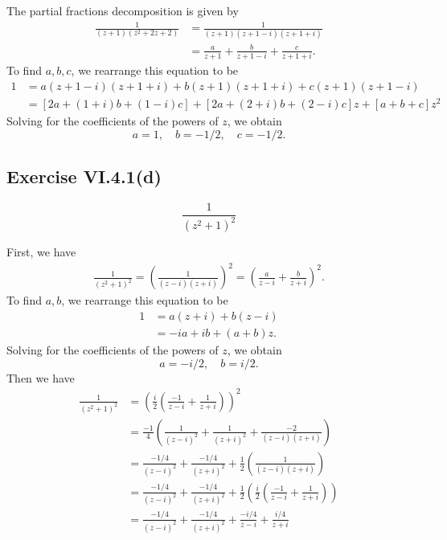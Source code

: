 \documentclass[12pt]{article}
\newenvironment{pbox}
    {\begin{lrbox}{\mybox}\begin{minipage}{0.98\textwidth}}
    {\end{minipage}\end{lrbox}\begin{center}\framebox[\textwidth]{\usebox{\mybox}}\end{center}}
\theoremstyle{definition}
\newcommand{\pfrac}[2]{\left(\frac{#1}{#2}\right)}
\begin{document}
The partial fractions decomposition is given by
\begin{align*}
    \frac{1}{(z + 1)(z^2 + 2z + 2)}
        &= \frac{1}{(z + 1)(z + 1 - i)(z + 1 + i)} \\
        &= \frac{a}{z + 1} + \frac{b}{z + 1 - i} + \frac{c}{z + 1 + i}.
\end{align*}
To find $a, b, c$, we rearrange this equation to be
\begin{align*}
    1 
        &= a(z + 1 - i)(z + 1 + i) + b(z + 1)(z + 1 + i) + c(z + 1)(z + 1 - i) \\
        &= [2 a + (1 + i) b + (1 - i) c] + [2 a  + (2 + i) b + (2 - i) c] z + [a + b  + c] z^2
\end{align*}
Solving for the coefficients of the powers of $z$, we obtain
\[
    a = 1, \quad b = -1/2, \quad c = -1/2.
\]

\subsection{Exercise VI.4.1(d)}
\begin{pbox}
    \[
        \frac{1}{(z^2 + 1)^2}
    \]
\end{pbox}

First, we have
\begin{align*}
    \frac{1}{(z^2 + 1)^2}
        = \pfrac{1}{(z - i)(z + i)}^2
        = \left(\frac{a}{z - i} + \frac{b}{z + i}\right)^2.
\end{align*}
To find $a, b$, we rearrange this equation to be
\begin{align*}
    1 
        &= a (z + i) + b (z - i)  \\
        &= -ia + ib + (a + b) z. 
\end{align*}
Solving for the coefficients of the powers of $z$, we obtain
\[
    a = -i/2, \quad b = i/2.
\]
Then we have
\begin{align*}
    \frac{1}{(z^2 + 1)^2}
        &= \left(\frac{i}{2}\left(\frac{-1}{z - i} + \frac{1}{z + i}\right)\right)^2 \\
        &= \frac{-1}{4}\left(\frac{1}{(z - i)^2} + \frac{1}{(z + i)^2} + \frac{-2}{(z - i)(z + i)}\right) \\
        &= \frac{-1/4}{(z - i)^2} + \frac{-1/4}{(z + i)^2} + \frac{1}{2}\pfrac{1}{(z - i)(z + i)} \\
        &= \frac{-1/4}{(z - i)^2} + \frac{-1/4}{(z + i)^2} + \frac{1}{2}\left(\frac{i}{2}\left(\frac{-1}{z - i} + \frac{1}{z + i}\right)\right) \\
        &= \frac{-1/4}{(z - i)^2} + \frac{-1/4}{(z + i)^2} + \frac{-i/4}{z - i} + \frac{i/4}{z + i} \\
\end{align*}
\end{document}
